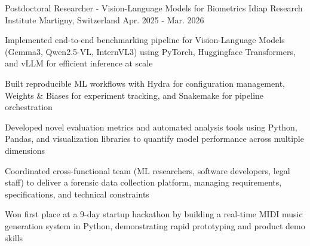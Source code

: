 

\begin{cventries}

\cventry
    {Postdoctoral Researcher - Vision-Language Models for Biometrics} %
    {Idiap Research Institute} %
    {Martigny, Switzerland} %
    {Apr. 2025 - Mar. 2026} %
    {
      \begin{cvitems} %
        \item {Implemented end-to-end benchmarking pipeline for Vision-Language Models (Gemma3, Qwen2.5-VL, InternVL3) using PyTorch, Huggingface Transformers, and vLLM for efficient inference at scale}
        \item {Built reproducible ML workflows with Hydra for configuration management, Weights \& Biases for experiment tracking, and Snakemake for pipeline orchestration}
        \item {Developed novel evaluation metrics and automated analysis tools using Python, Pandas, and visualization libraries to quantify model performance across multiple dimensions}
        \item {Coordinated cross-functional team (ML researchers, software developers, legal staff) to deliver a forensic data collection platform, managing requirements, specifications, and technical constraints}
        \item {Won first place at a 9-day startup hackathon by building a real-time MIDI music generation system in Python, demonstrating rapid prototyping and product demo skills}
      \end{cvitems}
    }


\end{cventries}
